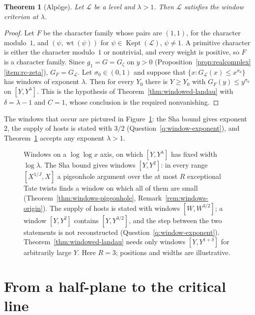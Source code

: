 \documentclass[11pt]{amsbook}
\theoremstyle{plain}
\newtheorem{theorem}{Theorem}[section]
\theoremstyle{definition}
\theoremstyle{remark}
\numberwithin{equation}{section}
\numberwithin{figure}{chapter}
\numberwithin{table}{chapter}
\newcommand{\lev}{\mathscr{L}}
\newcommand{\Gz}{G_{\zeta}}
\newcommand{\Kept}{\operatorname{Kept}}
\newcommand{\wt}{\operatorname{wt}}
\begin{document}
\begin{theorem}[Alp\"oge]\label{thm:level-criterion}
Let $\lev$ be a level and $\lambda>1$. Then $\lev$ satisfies the
window criterion at $\lambda$.
\end{theorem}

\begin{proof}
Let $F$ be the character family whose pairs are $(1,1)$, for the
character modulo~$1$, and $(\psi,\wt(\psi))$ for
$\psi\in\Kept(\lev)$, $\psi\ne1$. A primitive character is either the
character modulo~$1$ or nontrivial, and every weight is positive, so
$F$ is a character family. Since $g_1=G=\Gz$ on $y>0$
(Proposition~\ref{prop:realcomplex}\ref{item:rc-zeta}), $G_F=G_{\lev}$. Let
$\sigma_0\in(0,1)$ and suppose that $\{x:G_{\lev}(x)\le x^{\sigma_0}\}$
has windows of exponent $\lambda$. Then for every $Y_0$ there is
$Y\ge Y_0$ with $G_F(y)\le y^{\sigma_0}$ on $[Y,Y^\lambda]$. This is
the hypothesis of Theorem~\ref{thm:windowed-landau} with
$\delta=\lambda-1$ and $C=1$, whose conclusion is the required
nonvanishing.
\end{proof}

The windows that occur are pictured in Figure~\ref{fig:windows}: the
Sha bound gives exponent $2$, the supply of hosts is stated with
$3/2$ (Question~\ref{q:window-exponent}), and
Theorem~\ref{thm:level-criterion} accepts any exponent $\lambda>1$.

\begin{figure}[htbp]
\centering

\caption{Windows on a $\log\log x$ axis, on which $[Y,Y^\lambda]$ has
fixed width $\log\lambda$. The Sha bound gives windows $[Y,Y^2]$: in
every range $[X^{1/J},X]$ a pigeonhole argument over the at most $R$
exceptional Tate twists finds a window on which all of them are small
(Theorem~\ref{thm:windows-pigeonhole},
Remark~\ref{rem:windows-origin}). The supply of hosts is stated
with windows $[W,W^{3/2}]$; a window $[Y,Y^2]$ contains
$[Y,Y^{3/2}]$, and the step between the two statements is not
reconstructed (Question~\ref{q:window-exponent}).
Theorem~\ref{thm:windowed-landau} needs only windows
$[Y,Y^{1+\delta}]$ for arbitrarily large $Y$. Here $R=3$; positions
and widths are illustrative.}
\label{fig:windows}
\end{figure}

\section{From a half-plane to the critical line}
\end{document}
